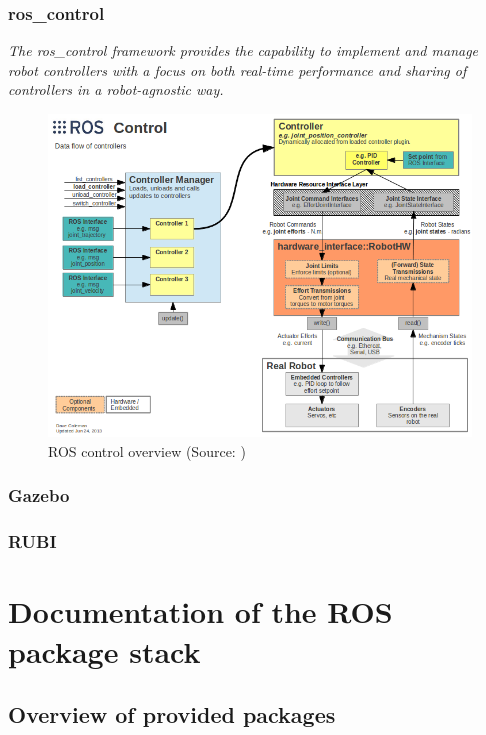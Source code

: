 \documentclass[english,inz,shortabstract]{iithesis}
\begin{document}
    \subsection{ros\_control}
    
    \textit{The ros\_control framework provides the capability to implement and manage robot controllers with a focus on both real-time performance and sharing of controllers in a robot-agnostic way.} 
    \cite{ros_control:paper}
    
    

    \begin{figure}[ht]
        \centering
        \includegraphics[width=\textwidth]{img/ros_control.png}
        \caption{ROS control overview (Source: \cite{ros_control:paper})}
        \label{fig:ros_control}
    \end{figure}

    \subsection{Gazebo}

    \subsection{RUBI}


\chapter{Documentation of the ROS package stack}

\section{Overview of provided packages}
\end{document}
